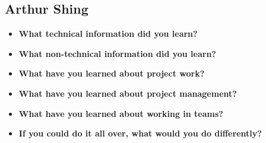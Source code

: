 \documentclass[onecolumn, draftclsnofoot,10pt, compsoc]{IEEEtran}
\begin{document}
\subsection{Arthur Shing}
\begin{itemize}
\item{\textbf{What technical information did you learn?}}

\item{\textbf{What non-technical information did you learn?}}

\item{\textbf{What have you learned about project work?}}

\item{\textbf{What have you learned about project management?}}


\item{\textbf{What have you learned about working in teams?}}


\item{\textbf{If you could do it all over, what would you do differently?}}
\end{itemize}

	



\pagebreak
\clearpage
\end{document}
